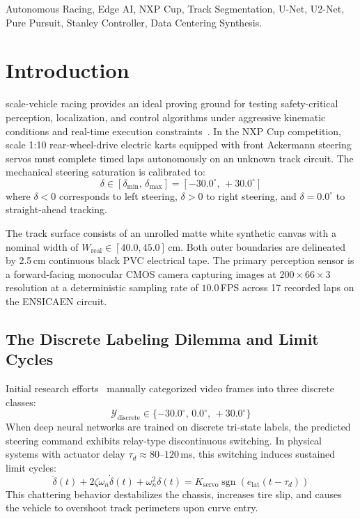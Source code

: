 \documentclass[10pt,journal,compsoc]{IEEEtran}
\begin{document}
{\begin{IEEEkeywords}
Autonomous Racing, Edge AI, NXP Cup, Track Segmentation, U-Net, U2-Net, Pure Pursuit, Stanley Controller, Data Centering Synthesis.
\end{IEEEkeywords}}

\maketitle
\IEEEdisplaynontitleabstractindextext
\IEEEpeerreviewmaketitle

\section{Introduction}
 scale-vehicle racing provides an ideal proving ground for testing safety-critical perception, localization, and control algorithms under aggressive kinematic conditions and real-time execution constraints~\cite{bojarski2016end}. In the NXP Cup competition, scale 1:10 rear-wheel-drive electric karts equipped with front Ackermann steering servos must complete timed laps autonomously on an unknown track circuit. The mechanical steering saturation is calibrated to:
\begin{equation}
\delta \in [\delta_{\min}, \, \delta_{\max}] = [-30.0^\circ, \, +30.0^\circ]
\end{equation}
where $\delta < 0$ corresponds to left steering, $\delta > 0$ to right steering, and $\delta = 0.0^\circ$ to straight-ahead tracking.

The track surface consists of an unrolled matte white synthetic canvas with a nominal width of $W_{\text{real}} \in [40.0, 45.0]$\,cm. Both outer boundaries are delineated by 2.5\,cm continuous black PVC electrical tape. The primary perception sensor is a forward-facing monocular CMOS camera capturing images at $200 \times 66 \times 3$ resolution at a deterministic sampling rate of $10.0$\,FPS across 17 recorded laps on the ENSICAEN circuit.

\subsection{The Discrete Labeling Dilemma and Limit Cycles}
Initial research efforts~\cite{palhano2026kart} manually categorized video frames into three discrete classes:
\begin{equation}
\mathcal{Y}_{\text{discrete}} \in \{-30.0^\circ, \, 0.0^\circ, \, +30.0^\circ\}
\end{equation}
When deep neural networks are trained on discrete tri-state labels, the predicted steering command exhibits relay-type discontinuous switching. In physical systems with actuator delay $\tau_d \approx 80\text{--}120$\,ms, this switching induces sustained limit cycles:
\begin{equation}
\ddot{\delta}(t) + 2\zeta\omega_n \dot{\delta}(t) + \omega_n^2 \delta(t) = K_{\text{servo}} \operatorname{sgn}\left(e_{\text{lat}}(t - \tau_d)\right)
\end{equation}
This chattering behavior destabilizes the chassis, increases tire slip, and causes the vehicle to overshoot track perimeters upon curve entry.
\end{document}

